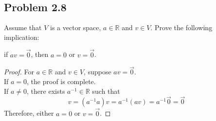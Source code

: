 \subsection*{Problem 2.8}
Assume that $V$ is a vector space, $a\in\mathbb{R}$ and $v\in V$. Prove the following implication:
	
	\begin{center}
		if $av=\vec{0}$, then $a=0$ or $v=\vec{0}$.
	\end{center}
\begin{proof}
    For $a\in\mathbb{R}$ and $v\in V$, suppose $av=\vec{0}$.\\
    If $a=0$, the proof is complete.\\
    If $a\not=0$, there exists $a^{-1}\in\mathbb{R}$ such that
    \[
        v=(a^{-1}a)v=a^{-1}(av)=a^{-1}\vec{0}=\vec{0}
    \]
    Therefore, either $a=0$ or $v=\vec{0}$.
\end{proof}
